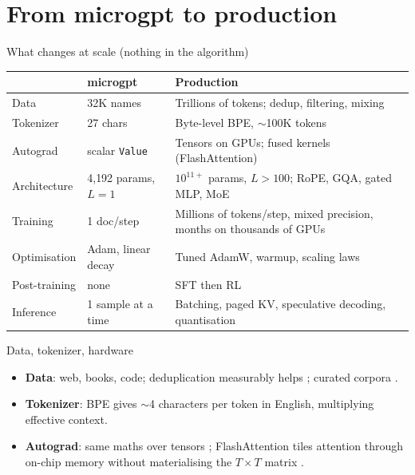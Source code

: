 \documentclass[aspectratio=169,11pt]{beamer}
\begin{document}
\section{From microgpt to production}
\begin{frame}{What changes at scale (nothing in the algorithm)}
\scriptsize
\begin{tabularx}{\textwidth}{@{}lXX@{}}
\toprule
& microgpt & Production \\
\midrule
Data & 32K names & Trillions of tokens; dedup, filtering, mixing \\
Tokenizer & 27 chars & Byte-level BPE, $\sim$100K tokens \\
Autograd & scalar \texttt{Value} & Tensors on GPUs; fused kernels (FlashAttention) \\
Architecture & 4{,}192 params, $L{=}1$ & $10^{11+}$ params, $L{>}100$; RoPE, GQA, gated MLP, MoE \\
Training & 1 doc/step & Millions of tokens/step, mixed precision, months on thousands of GPUs \\
Optimisation & Adam, linear decay & Tuned AdamW, warmup, scaling laws \\
Post-training & none & SFT then RL \\
Inference & 1 sample at a time & Batching, paged KV, speculative decoding, quantisation \\
\bottomrule
\end{tabularx}
\end{frame}

\begin{frame}{Data, tokenizer, hardware}
\begin{itemize}
  \item \textbf{Data}: web, books, code; deduplication measurably helps \parencite{lee2022dedup}; curated corpora \parencite{raffel2020t5,gao2020pile,penedo2024fineweb}.
  \item \textbf{Tokenizer}: BPE gives $\sim$4 characters per token in English, multiplying effective context.
  \item \textbf{Autograd}: same maths over tensors \parencite{paszke2019pytorch}; FlashAttention tiles attention through on-chip memory without materialising the $T\times T$ matrix \parencite{dao2022flashattention,dao2024flashattention2}.
\end{itemize}
\end{frame}
\end{document}
